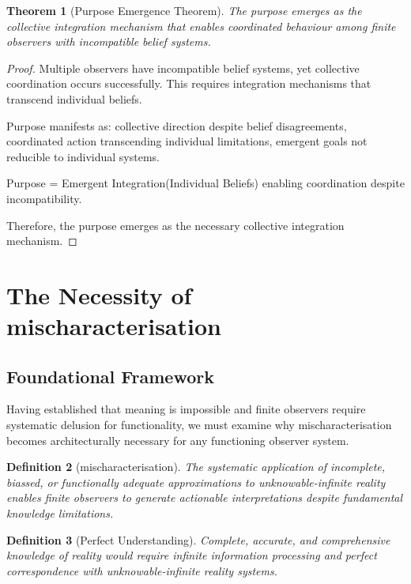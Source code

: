 \documentclass[12pt,a4paper]{article}
\newtheorem{theorem}{Theorem}[section]
\newtheorem{definition}[theorem]{Definition}
\begin{document}
\begin{theorem}[Purpose Emergence Theorem]
The purpose emerges as the collective integration mechanism that enables coordinated behaviour among finite observers with incompatible belief systems.
\end{theorem}

\begin{proof}
Multiple observers have incompatible belief systems, yet collective coordination occurs successfully. This requires integration mechanisms that transcend individual beliefs.

Purpose manifests as: collective direction despite belief disagreements, coordinated action transcending individual limitations, emergent goals not reducible to individual systems.

Purpose = Emergent Integration(Individual Beliefs) enabling coordination despite incompatibility.

Therefore, the purpose emerges as the necessary collective integration mechanism.
\end{proof}

\section{The Necessity of mischaracterisation}

\subsection{Foundational Framework}

Having established that meaning is impossible and finite observers require systematic delusion for functionality, we must examine why mischaracterisation becomes architecturally necessary for any functioning observer system.

\begin{definition}[mischaracterisation]
The systematic application of incomplete, biassed, or functionally adequate approximations to unknowable-infinite reality enables finite observers to generate actionable interpretations despite fundamental knowledge limitations.
\end{definition}

\begin{definition}[Perfect Understanding]
Complete, accurate, and comprehensive knowledge of reality would require infinite information processing and perfect correspondence with unknowable-infinite reality systems.
\end{definition}
\end{document}
